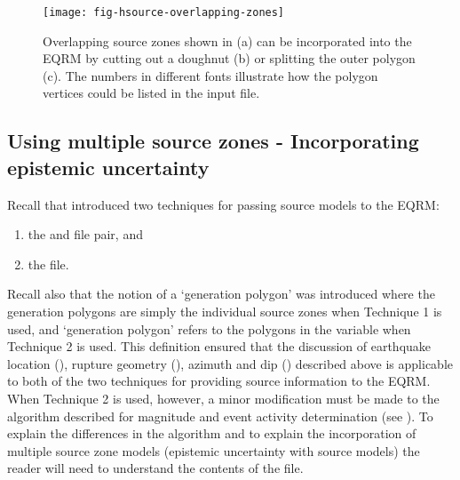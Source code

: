 \begin{figure}[htp]
\texttt{[image: fig-hsource-overlapping-zones]}
\caption{Overlapping source zones shown in (a) can be incorporated
into the EQRM by cutting out a doughnut (b) or splitting the outer
polygon (c). The numbers in different fonts illustrate how the
polygon vertices could be listed in the input file.
} \label{fig:h-source-overlapping}
\end{figure}



\subsection{Using multiple source zones - Incorporating epistemic uncertainty}
\label{sec:source-multizones}

Recall that  introduced two techniques for
passing source models to the EQRM:
\begin{enumerate}
\item the
 and
 file pair,
and \item the
 file.
\end{enumerate}
Recall also that the notion of a `generation
polygon' was introduced where the
generation polygons are simply the individual source zones when
Technique 1 is used, and `generation polygon' refers to the
polygons in the  variable when Technique 2
is used. This definition ensured that the discussion of earthquake
location (), rupture geometry
(), azimuth and dip
() described above is applicable to both
of the two techniques for providing source information to the
EQRM. When Technique 2 is used, however, a minor modification must
be made to the algorithm described for magnitude and event
activity determination (see ). To
explain the differences in the algorithm and to explain the
incorporation of multiple source zone models (epistemic
uncertainty with source models) the reader will need to understand
the contents of the
 file.

